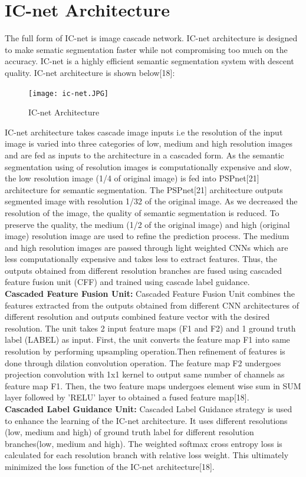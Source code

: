 \documentclass{IEEEtran}
\begin{document}
\section{\textbf{IC-net Architecture}}
The full form of IC-net is image cascade network. IC-net architecture is designed to make sematic segmentation faster while not compromising too much on the accuracy. IC-net is a highly efficient semantic segmentation system with descent quality. IC-net architecture is shown below[18]:

\begin{figure}[h]
    \centering
    \captionsetup{justification=centering}
    \texttt{[image: ic-net.JPG]}
    \caption{IC-net Architecture}
    \label{fig:Binary class segmented output}
\end{figure}

IC-net architecture takes cascade image inputs i.e the resolution of the input image is varied into three categories of low, medium and high resolution images and are fed as inputs to the architecture in a cascaded form. As the semantic segmentation using of resolution images is computationally expensive and slow, the low resolution image (1/4 of original image) is fed into PSPnet[21] architecture for semantic segmentation. The PSPnet[21] architecture outputs segmented image with resolution 1/32 of the original image. As we decreased the resolution of the image, the quality of semantic segmentation is reduced. To preserve the quality, the medium (1/2 of the original image) and high (original image) resolution image are used to refine the prediction process. The medium and high resolution images are passed through light weighted CNNs which are less computationally expensive and takes less to extract features. Thus, the outputs obtained from different resolution branches are fused using cascaded feature fusion unit (CFF) and trained using cascade label guidance.
\newline
\\
\textbf{Cascaded Feature Fusion Unit:}
Cascaded Feature Fusion Unit combines the features extracted from the outputs obtained from different CNN architectures of different resolution and outputs combined feature vector with the desired resolution. The unit takes 2 input feature maps (F1 and F2) and 1 ground truth label (LABEL) as input. First, the unit converts the feature map F1 into same resolution by performing upsampling operation.Then refinement of features is done through dilation convolution operation. The feature map F2 undergoes projection convolution with 1x1 kernel to output same number of channels as feature map F1. Then, the two feature maps undergoes element wise sum in SUM layer followed by 'RELU' layer to obtained a fused feature map[18]. 
\newline
\\
\textbf{Cascaded Label Guidance Unit:}
Cascaded Label Guidance strategy is used to enhance the learning of the IC-net architecture. It uses different resolutions (low, medium and high) of ground truth label for different resolution branches(low, medium and high). The weighted softmax cross entropy loss is calculated for each resolution branch with relative loss weight. This ultimately minimized the loss function of the IC-net architecture[18].
\end{document}
